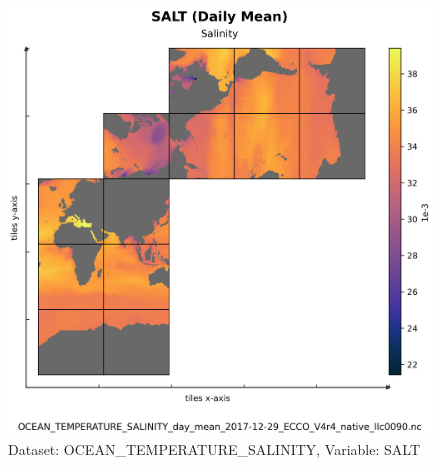 \begin{figure}[H]
\centering
\includegraphics[scale=0.55]{../images/plots/native_plots/Ocean_Temperature_and_Salinity/SALT.png}
\caption{Dataset: OCEAN\_TEMPERATURE\_SALINITY, Variable: SALT}
\label{tab:table-OCEAN_TEMPERATURE_SALINITY_SALT-Plot}
\end{figure}
\pagebreak
